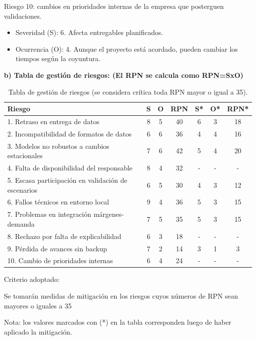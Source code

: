 \documentclass[
11pt, %
]{charter}
\begin{document}
Riesgo 10: cambios en prioridades internas de la empresa que posterguen validaciones.
\begin{itemize}
	\item Severidad (S):  6. Afecta entregables planificados.
	\item Ocurrencia (O): 4. Aunque el proyecto está acordado, pueden cambiar los tiempos según la coyuntura.
\end{itemize}


\textbf{b) Tabla de gestión de riesgos:      (El RPN se calcula como RPN=SxO)}

\begin{table}[htpb]
\centering
{}
\begin{tabular}{|p{5cm}|c|c|c|c|c|c|}
\hline
\rowcolor[HTML]{C0C0C0}
\textbf{Riesgo} & \textbf{S} & \textbf{O} & \textbf{RPN} & \textbf{S*} & \textbf{O*} & \textbf{RPN*} \\
\hline
1. Retraso en entrega de datos & 8 & 5 & 40 & 6 & 3 & 18 \\
2. Incompatibilidad de formatos de datos & 6 & 6 & 36 & 4 & 4 & 16 \\
3. Modelos no robustos a cambios estacionales & 7 & 6 & 42 & 5 & 4 & 20 \\
4. Falta de disponibilidad del responsable & 8 & 4 & 32 & - & - & - \\
5. Escasa participación en validación de escenarios & 6 & 5 & 30 & 4 & 3 & 12 \\
6. Fallos técnicos en entorno local & 9 & 4 & 36 & 5 & 3 & 15 \\
7. Problemas en integración márgenes-demanda & 7 & 5 & 35 & 5 & 3 & 15 \\
8. Rechazo por falta de explicabilidad & 6 & 3 & 18 & - & - & - \\
9. Pérdida de avances sin backup & 7 & 2 & 14 & 3 & 1 & 3 \\
10. Cambio de prioridades internas & 6 & 4 & 24 & - & - & - \\
\hline
\end{tabular}
\caption{Tabla de gestión de riesgos (se considera crítica toda RPN mayor o igual a 35).}
\end{table}

Criterio adoptado: 

Se tomarán medidas de mitigación en los riesgos cuyos números de RPN sean mayores o iguales a 35

Nota: los valores marcados con (*) en la tabla corresponden luego de haber aplicado la mitigación.
\end{document}
